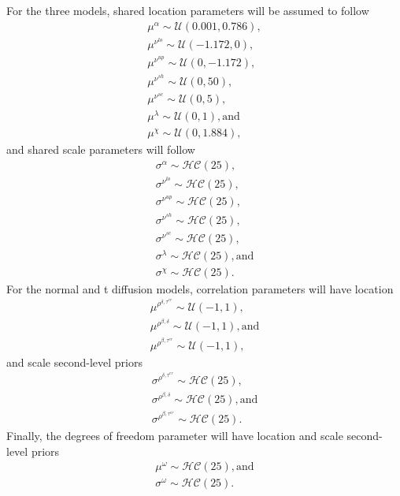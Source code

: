 \documentclass[12pt]{report}
\begin{document}
For the three models, shared location parameters will be assumed to follow
\begin{eqnarray}
\mu^{\alpha} \sim \mathcal{U}(0.001, 0.786), \nonumber \\
\mu^{\nu^{lo}} \sim \mathcal{U}(-1.172, 0), \nonumber \\
\mu^{\nu^{up}} \sim \mathcal{U}(0, -1.172), \nonumber \\
\mu^{\nu^{sh}} \sim \mathcal{U}(0, 50), \\
\mu^{\nu^{sc}} \sim \mathcal{U}(0, 5), \nonumber \\
\mu^{\lambda} \sim \mathcal{U}(0, 1), \text{and} \nonumber \\
\mu^{\chi} \sim \mathcal{U}(0, 1.884), \nonumber
\end{eqnarray}
and shared scale parameters will follow
\begin{eqnarray}
\sigma^{\alpha} \sim \mathcal{HC}(25), \nonumber \\
\sigma^{\nu^{lo}} \sim \mathcal{HC}(25), \nonumber \\
\sigma^{\nu^{up}} \sim \mathcal{HC}(25), \nonumber \\
\sigma^{\nu^{sh}} \sim \mathcal{HC}(25), \\
\sigma^{\nu^{sc}} \sim \mathcal{HC}(25), \nonumber \\
\sigma^{\lambda} \sim \mathcal{HC}(25), \text{and} \nonumber \\
\sigma^{\chi} \sim \mathcal{HC}(25). \nonumber
\end{eqnarray}
For the normal and t diffusion models, correlation parameters will have location 
\begin{eqnarray}
\mu^{\rho^{\delta,\tau^{er}}} \sim \mathcal{U}(-1, 1), \nonumber \\
\mu^{\rho^{\beta,\delta}} \sim \mathcal{U}(-1, 1), \text{and} \\
\mu^{\rho^{\beta,\tau^{er}}} \sim \mathcal{U}(-1, 1), \nonumber
\end{eqnarray}
and scale second-level priors
\begin{eqnarray}
\sigma^{\rho^{\delta,\tau^{er}}} \sim \mathcal{HC}(25), \nonumber \\
\sigma^{\rho^{\beta,\delta}} \sim \mathcal{HC}(25), \text{and} \\
\sigma^{\rho^{\beta,\tau^{er}}} \sim \mathcal{HC}(25). \nonumber
\end{eqnarray}
Finally, the degrees of freedom parameter will have location and scale second-level priors
\begin{eqnarray}
\mu^{\omega} \sim \mathcal{HC}(25), \text{and} \nonumber \\
\sigma^{\omega} \sim \mathcal{HC}(25).
\end{eqnarray}
\end{document}
